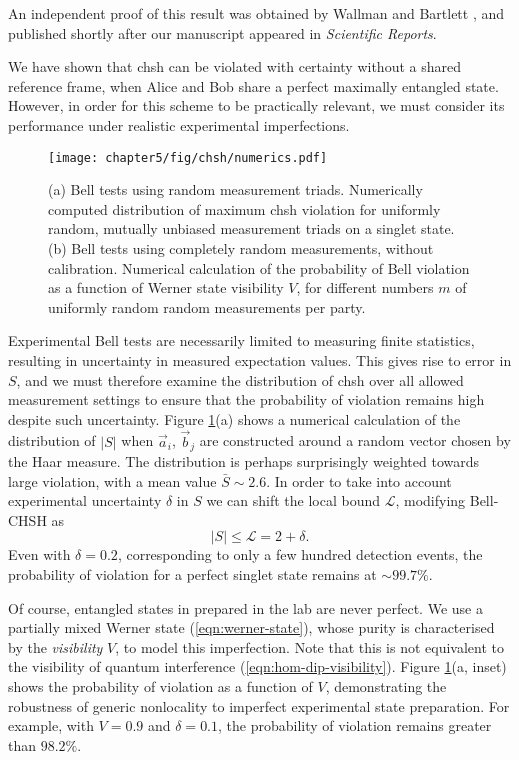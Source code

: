An independent proof of this result was obtained by Wallman and Bartlett \cite{Wallman2012}, and published shortly after our manuscript appeared in \emph{Scientific Reports}.

\vspace{5mm}
We have shown that \gls{chsh} can be violated with certainty without a shared reference frame, when Alice and Bob share a perfect maximally entangled state. However, in order for this scheme to be practically relevant, we must consider its performance under realistic experimental imperfections. 

\begin{figure}[!t]
\texttt{[image: chapter5/fig/chsh/numerics.pdf]}
\caption[Bell tests using random measurement triads.]{\label{fig:theory} (a) Bell tests using random measurement triads. Numerically computed distribution of maximum \gls{chsh} violation for
uniformly random, mutually unbiased measurement triads on a singlet state. (b) Bell tests using completely random measurements, without calibration. Numerical calculation of the probability of Bell violation as a function of Werner state visibility $V$, for different numbers $m$ of uniformly random random measurements per party.}
\label{fig:chsh-distribution}
\end{figure}

Experimental Bell tests are necessarily limited to measuring finite statistics, resulting in uncertainty in measured expectation values. This gives rise to error in $S$, and we must therefore examine the distribution of \gls{chsh} over all allowed measurement settings to ensure that the probability of violation remains high despite such uncertainty. Figure \ref{fig:chsh-distribution}(a) shows a numerical calculation of the distribution of $|S|$ when $\vec{a}_i$, $\vec{b}_j$ are constructed around a random vector chosen by the Haar measure. The distribution is perhaps surprisingly weighted towards large violation, with a mean value $\bar{S} \sim2.6$. In order to take into account experimental uncertainty $\delta$ in $S$ we can shift the local bound $\mathcal{L}$, modifying Bell-CHSH as
\begin{equation}
    |S| \le \mathcal{L} = 2 + \delta.
\end{equation}
Even with $\delta=0.2$, corresponding to only a few hundred detection events, the probability of violation for a perfect singlet state remains at $\sim 99.7\%$.

Of course, entangled states in prepared in the lab are never perfect. We use a partially mixed Werner state (\ref{eqn:werner-state}), whose purity is characterised by the \emph{visibility} $V$, to model this imperfection. Note that this is not equivalent to the visibility of quantum interference (\ref{eqn:hom-dip-visibility}).
Figure \ref{fig:chsh-distribution}(a, inset) shows the probability of violation as a function of $V$, demonstrating the robustness of generic nonlocality to imperfect experimental state preparation. For example, with $V=0.9$ and $\delta=0.1$, the probability of violation remains greater than $98.2\%$.

